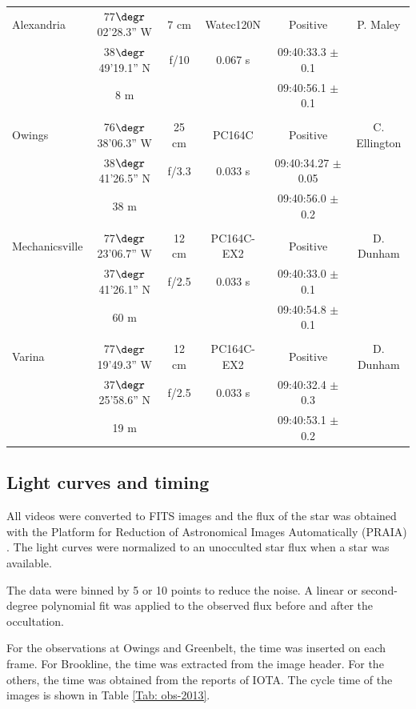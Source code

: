\documentclass[useAMS,usenatbib]{mn2e}
\begin{document}
\begin{table}
\begin{minipage}{140mm}
\begin{tabular}{@{}lccccc}
 Alexandria & 77$\degr$02'28.3'' W & 7 cm & Watec120N & Positive & P. Maley \\
  &38$\degr$49'19.1'' N & f/10 &  0.067 s   & 09:40:33.3 $\pm$ 0.1 &   \\
            & 8 m       &   &     & 09:40:56.1  $\pm$ 0.1 &   \\
 & & & & & \\
 Owings & 76$\degr$38'06.3'' W & 25 cm & PC164C  & Positive & C. Ellington \\
  &38$\degr$41'26.5'' N & f/3.3 &  0.033 s & 09:40:34.27 $\pm$ 0.05 &   \\
            & 38 m                &       &     & 09:40:56.0  $\pm$ 0.2 &   \\
 & & & & & \\
 Mechanicsville & 77$\degr$23'06.7'' W & 12 cm & PC164C-EX2 & Positive & D. Dunham \\
  &37$\degr$41'26.1'' N & f/2.5 & 0.033 s    & 09:40:33.0 $\pm$ 0.1 &   \\
            & 60 m      &   &     & 09:40:54.8  $\pm$ 0.1 &   \\
 & & & & & \\
 Varina & 77$\degr$19'49.3'' W & 12 cm & PC164C-EX2 & Positive & D. Dunham \\
  &37$\degr$25'58.6'' N & f/2.5 &  0.033 s   & 09:40:32.4 $\pm$ 0.3 &   \\
            & 19 m      &   &     & 09:40:53.1  $\pm$ 0.2 &   \\

\hline
\end{tabular}
\end{minipage}
\end{table}

\subsection{Light curves and timing}

All videos were converted to FITS images and the flux of the star was obtained with the Platform for Reduction of Astronomical Images Automatically (PRAIA) \citep{2011gfun.conf...85A}. The light curves were normalized to an unocculted star flux when a star was available.

The data were binned by 5 or 10 points to reduce the noise. A linear or second-degree polynomial fit was applied to the observed flux before and after the occultation.

For the observations at Owings and Greenbelt, the time was inserted on each frame. For Brookline, the time was extracted from the image header. For the others, the time was obtained from the reports of IOTA. The cycle time of the images is shown in Table \ref{Tab: obs-2013}.
\end{document}
